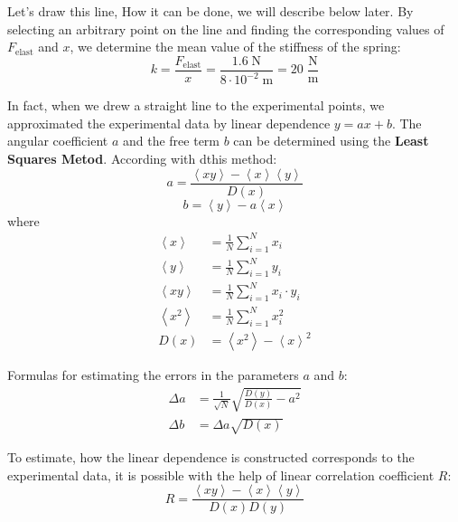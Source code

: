 \documentclass{LabWorkEng}
\begin{document}
Let's draw this line, How it can be done, we will describe below later. By selecting an arbitrary point on the line and finding the corresponding values of $F_\mathrm{elast}$ and $x$, we determine the mean value of the stiffness of the spring:
\begin{equation*}
k = \frac{F_\mathrm{elast}}{x} = \frac{{1.6\;\text{N}}}{{8\cdot 10^{-2}\;\text{m}}} = 20\;\frac{\text{N}}{\text{m}}
\end{equation*}

\begin{More}
	In fact, when we drew a straight line to the experimental points, we approximated the experimental data by linear dependence $y = ax + b$. The angular coefficient $a$ and the free term $b$ can be determined using the  \textbf{Least Squares Metod}.
	According with dthis method:
	\begin{equation}\label{MLSa}
		a = \frac{{\left\langle xy \right\rangle  - \left\langle x \right\rangle \left\langle y \right\rangle }}{{D\left( x \right)}}
	\end{equation}
	\begin{equation}\label{MLSb}
		b = \left\langle y \right\rangle  - a\left\langle x \right\rangle
	\end{equation}
	where 
	\begin{align}
		\left\langle x \right\rangle &= \frac{1}{N}\sum\limits_{i = 1}^N x_i \\
		\left\langle y \right\rangle &= \frac{1}{N}\sum\limits_{i = 1}^N y_i \\
		\left\langle xy \right\rangle &= \frac{1}{N}\sum\limits_{i = 1}^N x_i\cdot y_i \\
		\left\langle x^2 \right\rangle &= \frac{1}{N}\sum\limits_{i = 1}^N x^2_i \\
		D(x) &= \left\langle x^2 \right\rangle  -\left\langle x \right\rangle^2 
	\end{align}

Formulas for estimating the errors in the parameters $a$ and $b$:
\begin{align}
	\Delta a &= \frac{1}{\sqrt{N}}\sqrt{\frac{D(y)}{D(x)} - a^2} \\
	\Delta b &= \Delta a \sqrt{D(x)}
\end{align}
\end{More}

To estimate, how the linear dependence is constructed corresponds to the experimental data, it is possible with the help of linear correlation coefficient $R$: 
\begin{equation}\label{R}
	R = \frac{{\left\langle {xy} \right\rangle  - \left\langle x \right\rangle \left\langle y \right\rangle }}{{D\left( x \right)D\left( y \right)}}
\end{equation}
\end{document}
